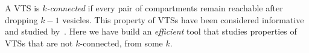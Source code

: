 %

A VTS is {\em $k$-connected} if every pair of compartments remain
reachable after dropping $k-1$ vesicles.
%
This property of VTSs have been considered informative and
studied by~\cite{shukla}.
%
Here we have build an {\em efficient} tool that studies properties of
VTSs that are not $k$-connected, from some $k$. 



